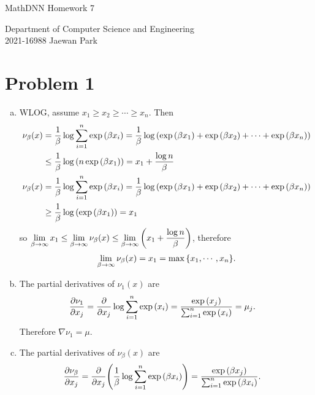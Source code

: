 \documentclass[10pt]{article}
\begin{document}
\begin{center}
    {\LARGE MathDNN Homework 7} \\
\end{center}
\begin{flushright}
    Department of Computer Science and Engineering \\
    2021-16988 Jaewan Park
\end{flushright}

\section*{Problem 1}
\begin{enumerate}[(a)]
    \item WLOG, assume $x_1 \geq x_2 \geq \cdots \geq x_n$. 
    Then 
    \begin{align*}
        \nu_\beta(x) &= \frac{1}{\beta}\log\sum_{i=1}^{n}\exp\qty(\beta x_i) = \frac{1}{\beta}\log\qty(\exp\qty(\beta x_1) + \exp\qty(\beta x_2) + \cdots + \exp\qty(\beta x_n)) \\
        &\leq \frac{1}{\beta}\log \qty(n\exp\qty(\beta x_1)) = x_1 + \frac{\log{n}}{\beta} \\
        \nu_\beta(x) &= \frac{1}{\beta}\log\sum_{i=1}^{n}\exp\qty(\beta x_i) = \frac{1}{\beta}\log\qty(\exp\qty(\beta x_1) + \exp\qty(\beta x_2) + \cdots + \exp\qty(\beta x_n)) \\
        &\geq \frac{1}{\beta}\log\qty(\exp\qty(\beta x_1)) = x_1 \\
    \end{align*}
    so $\displaystyle \lim_{\beta \to \infty}x_1 \leq \lim_{\beta \to \infty}\nu_\beta(x) \leq \lim_{\beta \to \infty}\qty(x_1 + \frac{\log{n}}{\beta})$, therefore
    $$\displaystyle \lim_{\beta \to \infty}\nu_\beta(x) = x_1 = \max\qty{x_1, \cdots, x_n}.$$
    \item The partial derivatives of $\nu_1(x)$ are
    \begin{align*}
        \frac{\partial\nu_1}{\partial x_j} &= \frac{\partial}{\partial x_j}\log\sum_{i=1}^{n}\exp\qty(x_i) = \frac{\exp\qty(x_j)}{\sum_{i=1}^{n}\exp\qty(x_i)} = \mu_j.
    \end{align*}
    Therefore $\nabla\nu_1 = \mu$.
    \item The partial derivatives of $\nu_\beta(x)$ are
    \begin{align*}
        \frac{\partial\nu_\beta}{\partial x_j} &= \frac{\partial}{\partial x_j}\qty(\frac{1}{\beta}\log\sum_{i=1}^{n}\exp\qty(\beta x_i)) = \frac{\exp\qty(\beta x_j)}{\sum_{i=1}^{n}\exp\qty(\beta x_i)}.

\end{align*}
\end{enumerate}
\end{document}
